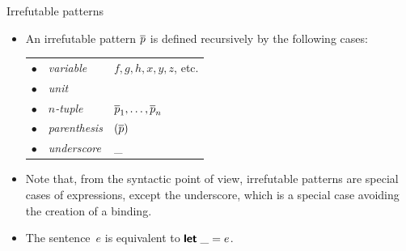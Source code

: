 %
\begin{frame}{Irrefutable patterns}

  \begin{itemize}

    \item An irrefutable pattern $\overline{p}$ is defined recursively by
      the following cases:\\
      \smallskip
      \begin{tabular}{r@{\,\,}ll@{}}
        $\bullet$
        & \emph{variable}
        & $f, g, h, x, y, z$, etc. \\
        $\bullet$
        & \emph{unit}
        & \unit\\
        $\bullet$
        & \emph{$n$-tuple}
        & $\overline{p}_1, \ldots, \overline{p}_n$\\
        $\bullet$
        & \emph{parenthesis}
        & $(\overline{p})$\\
        $\bullet$
        & \emph{underscore}
        & {\Large \_}
      \end{tabular}

      \item Note that, from the syntactic point of view, irrefutable
        patterns are special cases of expressions, except the
        underscore, which is a special case avoiding the creation of a
        binding.

      \item The sentence~\(e\) is equivalent to \(\textsf{\textbf{let}} \; \_ = e\).

  \end{itemize}

\end{frame}

